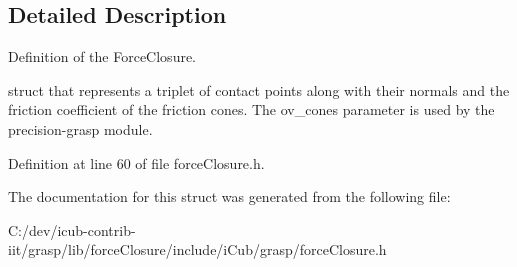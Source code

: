 \subsection{Detailed Description}
Definition of the Force\+Closure. 

struct that represents a triplet of contact points along with their normals and the friction coefficient of the friction cones. The ov\+\_\+cones parameter is used by the precision-\/grasp module. 

Definition at line 60 of file force\+Closure.\+h.



The documentation for this struct was generated from the following file\+:\begin{DoxyCompactItemize}
\item 
C\+:/dev/icub-\/contrib-\/iit/grasp/lib/force\+Closure/include/i\+Cub/grasp/force\+Closure.\+h\end{DoxyCompactItemize}
